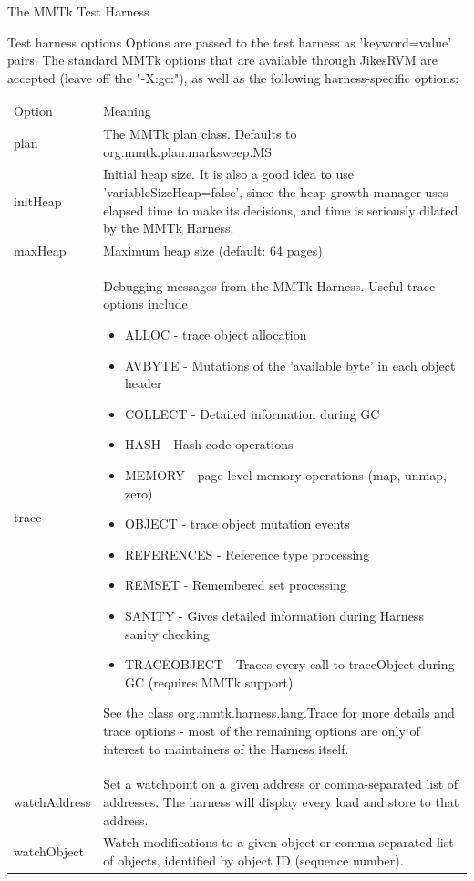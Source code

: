 \begin{section}{The MMTk Test Harness}
\begin{subsection}{Test harness options}
Options are passed to the test harness as 'keyword=value' pairs.  The standard MMTk options that are available through JikesRVM are accepted (leave off the "-X:gc:"), as well as the following harness-specific options:

\begin{center}
\begin{longtable}{p{}p{}}
Option & Meaning \\
plan & The MMTk plan class.  Defaults to org.mmtk.plan.marksweep.MS \\
initHeap & Initial heap size.  It is also a good idea to use 'variableSizeHeap=false', since the heap growth manager uses elapsed time to make its decisions, and time is seriously dilated by the MMTk Harness. \\
maxHeap & Maximum heap size (default: 64 pages) \\
trace & Debugging messages from the MMTk Harness.  Useful trace options include
\begin{itemize}
  \item ALLOC - trace object allocation
  \item AVBYTE - Mutations of the 'available byte' in each object header
  \item COLLECT - Detailed information during GC
  \item HASH - Hash code operations
  \item MEMORY - page-level memory operations (map, unmap, zero)
  \item OBJECT - trace object mutation events 
  \item REFERENCES - Reference type processing
  \item REMSET - Remembered set processing
  \item SANITY - Gives detailed information during Harness sanity checking
  \item TRACEOBJECT - Traces every call to traceObject during GC (requires MMTk support)
\end{itemize}
    See the class org.mmtk.harness.lang.Trace for more details and trace options - most of the remaining options are only of interest to maintainers of the Harness itself. \\
watchAddress & Set a watchpoint on a given address or comma-separated list of addresses.  The harness will display every load and store to that address. \\
watchObject & Watch modifications to a given object or comma-separated list of objects, identified by object ID (sequence number). \\

\end{longtable}
\end{center}
\end{subsection}
\end{section}
